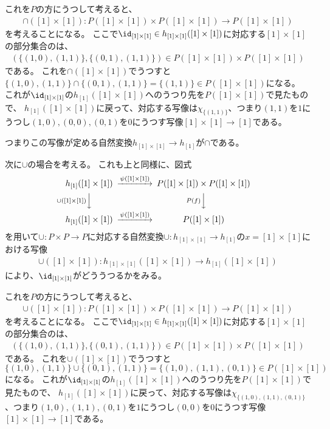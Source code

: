 \documentclass[uplatex]{jsarticle}
\begin{document}
これを$P$の方にうつして考えると、
\begin{align*}
\cap([1]\times[1]):P([1]\times[1])\times P([1]\times[1])\to P([1]\times[1])
\end{align*}
を考えることになる。
ここで$\id_{[1]\times[1]}\in h_{[1]\times[1]}([1]\times[1])$に対応する$[1] \times [1]$の部分集合のは、
\begin{align*}
(\{(1,0),(1,1)\},\{(0,1),(1,1)\})\in P([1]\times[1])\times P([1]\times[1])
\end{align*}
である。
これを$\cap([1]\times[1])$でうつすと$\{(1,0),(1,1)\} \cap \{(0,1),(1,1)\} = \{(1,1)\} \in P([1]\times[1])$になる。
これが$\id_{[1]\times[1]}$の$h_{[1]}([1] \times [1])$へのうつり先を$P([1]\times[1])$で見たもので、
$h_{[1]}([1]\times[1])$に戻って、対応する写像は$\chi_{\{(1,1)\}}$、つまり$(1,1)$を$1$にうつし$(1,0), (0,0), (0,1)$を$0$にうつす写像$[1]\times[1] \to [1]$である。

つまりこの写像が定める自然変換$h_{[1]\times[1]} \to h_{[1]}$が$\cap$である。

次に$\cup$の場合を考える。
これも上と同様に、図式
\begin{align*}
\begin{CD}
h_{[1]}([1]\times[1])@>\psi([1]\times[1])>>P([1]\times[1])\times P([1]\times[1])\\
@V\cup([1]\times[1])VV@VP(f)VV\\
h_{[1]}([1]\times[1])@>\psi([1]\times[1])>>P([1]\times[1])
\end{CD}
\end{align*}
を用いて$\cup:P\times P \to P$に対応する自然変換$\cup:h_{[1]\times[1]} \to h_{[1]}$の$x=[1]\times[1]$における写像\begin{align*}
\cup([1]\times[1]):h_{[1]\times[1]}([1]\times[1]) \to h_{[1]}([1]\times[1])
\end{align*}
により、$\id_{[1]\times[1]}$がどううつるかをみる。

これを$P$の方にうつして考えると、
\begin{align*}
\cup([1]\times[1]):P([1]\times[1])\times P([1]\times[1])\to P([1]\times[1])
\end{align*}
を考えることになる。
ここで$\id_{[1]\times[1]}\in h_{[1]\times[1]}([1]\times[1])$に対応する$[1] \times [1]$の部分集合のは、
\begin{align*}
(\{(1,0),(1,1)\},\{(0,1),(1,1)\})\in P([1]\times[1])\times P([1]\times[1])
\end{align*}
である。
これを$\cup([1]\times[1])$でうつすと$\{(1,0),(1,1)\} \cup \{(0,1),(1,1)\} = \{(1,0), (1,1), (0,1)\} \in P([1]\times[1])$になる。
これが$\id_{[1]\times[1]}$の$h_{[1]}([1] \times [1])$へのうつり先を$P([1]\times[1])$で見たもので、
$h_{[1]}([1]\times[1])$に戻って、対応する写像は$\chi_{\{(1,0), (1,1), (0,1)\}}$、つまり$(1,0), (1,1), (0,1)$を$1$にうつし$(0,0)$を$0$にうつす写像$[1]\times[1] \to [1]$である。
\end{document}
